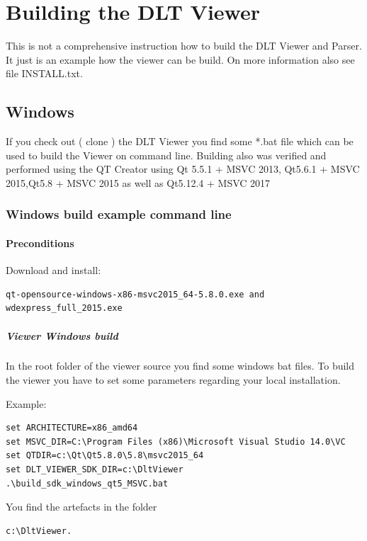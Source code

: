 \documentclass[a4paper,11pt]{article}
\begin{document}
\pagebreak


\section{Building the DLT Viewer}
This is not a comprehensive instruction how to build the DLT Viewer and Parser.
It just is an example how the viewer can be build. On more information also see file INSTALL.txt.

\subsection{Windows}
If you check out ( clone ) the DLT Viewer you find some *.bat file which can be used to build the Viewer on command line.
Building also was verified and performed using the QT Creator using Qt 5.5.1 + MSVC 2013, Qt5.6.1 + MSVC 2015,Qt5.8 + MSVC 2015
as well as Qt5.12.4 + MSVC 2017


\subsubsection{Windows build example command line}
\paragraph{Preconditions}
Download and install:
\begin{verbatim}
qt-opensource-windows-x86-msvc2015_64-5.8.0.exe and
wdexpress_full_2015.exe
\end{verbatim}

\subparagraph{Viewer Windows build}
In the root folder of the viewer source you find some windows bat files.
To build the viewer you have to set some parameters regarding your local installation.

Example:

\begin{verbatim}
set ARCHITECTURE=x86_amd64
set MSVC_DIR=C:\Program Files (x86)\Microsoft Visual Studio 14.0\VC
set QTDIR=c:\Qt\Qt5.8.0\5.8\msvc2015_64
set DLT_VIEWER_SDK_DIR=c:\DltViewer
.\build_sdk_windows_qt5_MSVC.bat
\end{verbatim}

You find the artefacts in the folder 
\begin{verbatim}
c:\DltViewer.
\end{verbatim}
\end{document}
